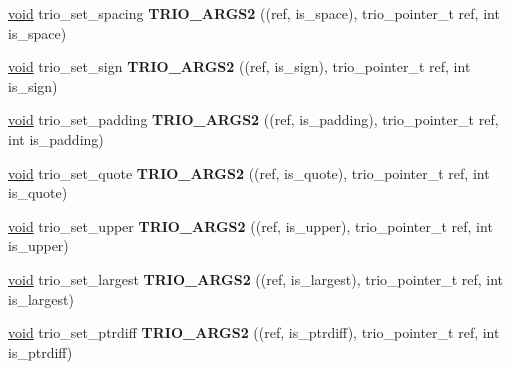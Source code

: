 \begin{DoxyCompactItemize}
\mbox{\label{group___user_defined_ga20db05e939427ee0e6b45bf240db6f26}} 
\hyperlink{interfacevoid}{void} trio\+\_\+set\+\_\+spacing {\bfseries T\+R\+I\+O\+\_\+\+A\+R\+G\+S2} ((ref, is\+\_\+space), trio\+\_\+pointer\+\_\+t ref, int is\+\_\+space)
\item 
\mbox{\label{group___user_defined_gafca0e6c760dfc9208ffb12cbe02d444b}} 
\hyperlink{interfacevoid}{void} trio\+\_\+set\+\_\+sign {\bfseries T\+R\+I\+O\+\_\+\+A\+R\+G\+S2} ((ref, is\+\_\+sign), trio\+\_\+pointer\+\_\+t ref, int is\+\_\+sign)
\item 
\mbox{\label{group___user_defined_ga0f7566c59ca57e2c21ecbcdad999c4c8}} 
\hyperlink{interfacevoid}{void} trio\+\_\+set\+\_\+padding {\bfseries T\+R\+I\+O\+\_\+\+A\+R\+G\+S2} ((ref, is\+\_\+padding), trio\+\_\+pointer\+\_\+t ref, int is\+\_\+padding)
\item 
\mbox{\label{group___user_defined_gafd085297afaab050579d602be4a93ed5}} 
\hyperlink{interfacevoid}{void} trio\+\_\+set\+\_\+quote {\bfseries T\+R\+I\+O\+\_\+\+A\+R\+G\+S2} ((ref, is\+\_\+quote), trio\+\_\+pointer\+\_\+t ref, int is\+\_\+quote)
\item 
\mbox{\label{group___user_defined_gacd055da0da026140b4b8f990b7b97e2a}} 
\hyperlink{interfacevoid}{void} trio\+\_\+set\+\_\+upper {\bfseries T\+R\+I\+O\+\_\+\+A\+R\+G\+S2} ((ref, is\+\_\+upper), trio\+\_\+pointer\+\_\+t ref, int is\+\_\+upper)
\item 
\mbox{\label{group___user_defined_ga6de84751af6a660c71ee53e03f9ee3fc}} 
\hyperlink{interfacevoid}{void} trio\+\_\+set\+\_\+largest {\bfseries T\+R\+I\+O\+\_\+\+A\+R\+G\+S2} ((ref, is\+\_\+largest), trio\+\_\+pointer\+\_\+t ref, int is\+\_\+largest)
\item 
\mbox{\label{group___user_defined_gaefb751306ffa919c8b94bce5588a79af}} 
\hyperlink{interfacevoid}{void} trio\+\_\+set\+\_\+ptrdiff {\bfseries T\+R\+I\+O\+\_\+\+A\+R\+G\+S2} ((ref, is\+\_\+ptrdiff), trio\+\_\+pointer\+\_\+t ref, int is\+\_\+ptrdiff)
\item 
\mbox{\label{group___user_defined_ga50748f823ed75cb10c14911a74188097}} 

\end{DoxyCompactItemize}
